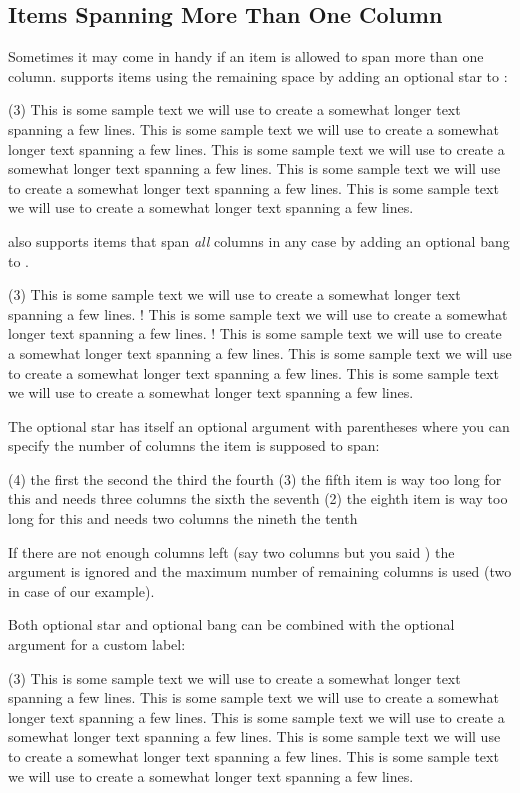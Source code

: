\documentclass[load-preamble+]{cnltx-doc}
\newcommand*\sample{This is some sample text we will use to create a somewhat
  longer text spanning a few lines.}
\begin{document}
\subsection{Items Spanning More Than One Column}
Sometimes it may come in handy if an item is allowed to span more than one
column.  \Tasks{} supports items using the remaining space by
adding an optional\label{optional-star} star to :
\begin{example}
  \begin{tasks}(3)
    \task \sample
    \task* \sample
    \task* \sample
    \task \sample
    \task \sample
  \end{tasks}
\end{example}

\Tasks{} also supports items that span \emph{all} columns in
any case by adding an optional bang\label{optional-bang} to .
\begin{example}
  \begin{tasks}(3)
    \task \sample
    \task! \sample
    \task! \sample
    \task \sample
    \task \sample
  \end{tasks}
\end{example}

The optional star has itself an optional argument with parentheses where you
can specify the number of columns the item is supposed to span:\label{debug}
\begin{example}
  \begin{tasks}(4)
    \task the first
    \task the second
    \task the third
    \task the fourth
    \task*(3) the fifth item is way too long for this and needs three columns
    \task the sixth
    \task the seventh
    \task*(2) the eighth item is way too long for this and needs two columns
    \task the nineth
    \task the tenth
  \end{tasks}
\end{example}
If there are not enough columns left (say two columns but you said
\sarg{}) the argument is ignored and the maximum number of
remaining columns is used (two in case of our example).

Both optional star and optional bang can be combined with the optional
argument for a custom label:
\begin{example}
  \begin{tasks}(3)
    \task \sample
    \task* \sample
    \task*[(x)] \sample
    \task \sample
    \task \sample
  \end{tasks}
\end{example}
\end{document}
